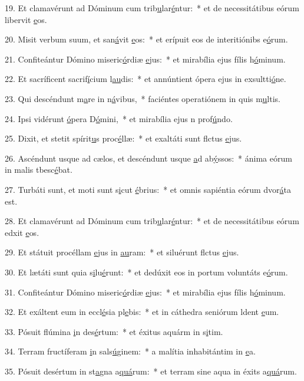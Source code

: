 19. Et clamavérunt ad Dóminum cum trib\uline{u}lar\uline{é}ntur:~* et de necessitátibus eórum libervit \uline{e}os.\par 
20. Misit verbum suum, et san\uline{á}vit \uline{e}os:~* et erípuit eos de interitiónibs e\uline{ó}rum.\par 
21. Confiteántur Dómino miseric\uline{ó}rdiæ \uline{e}jus:~* et mirabília ejus fílis h\uline{ó}minum.\par 
22. Et sacríficent sacrif\uline{í}cium l\uline{au}dis:~* et annúntient ópera ejus in exsultti\uline{ó}ne.\par 
23. Qui descéndunt m\uline{a}re in n\uline{á}vibus,~* faciéntes operatiónem in quis m\uline{u}ltis.\par 
24. Ipsi vidérunt \uline{ó}pera D\uline{ó}mini,~* et mirabília ejus n prof\uline{ú}ndo.\par 
25. Dixit, et stetit spírit\uline{u}s proc\uline{é}llæ:~* et exaltáti sunt flctus \uline{e}jus.\par 
26. Ascéndunt usque ad cælos, et descéndunt usque \uline{a}d ab\uline{ý}ssos:~* ánima eórum in malis tbesc\uline{é}bat.\par 
27. Turbáti sunt, et moti sunt s\uline{i}cut \uline{é}brius:~* et omnis sapiéntia eórum dvor\uline{á}ta est.\par 
28. Et clamavérunt ad Dóminum cum trib\uline{u}lar\uline{é}ntur:~* et de necessitátibus eórum edxit \uline{e}os.\par 
29. Et státuit procéllam \uline{e}jus in \uline{au}ram:~* et siluérunt flctus \uline{e}jus.\par 
30. Et lætáti sunt quia s\uline{i}lu\uline{é}runt:~* et dedúxit eos in portum voluntáts e\uline{ó}rum.\par 
31. Confiteántur Dómino miseric\uline{ó}rdiæ \uline{e}jus:~* et mirabília ejus fílis h\uline{ó}minum.\par 
32. Et exáltent eum in eccl\uline{é}sia pl\uline{e}bis:~* et in cáthedra seniórum ldent \uline{e}um.\par 
33. Pósuit flúmina \uline{i}n des\uline{é}rtum:~* et éxitus aquárm in s\uline{i}tim.\par 
34. Terram fructíferam \uline{i}n sals\uline{ú}ginem:~* a malítia inhabitántim in \uline{e}a.\par 
35. Pósuit desértum in st\uline{a}gna a\uline{quá}rum:~* et terram sine aqua in éxits a\uline{quá}rum.\par 
